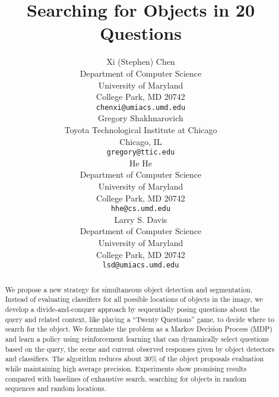\documentclass{article} %
\title{Searching for Objects in 20 Questions}
\author{
Xi (Stephen) Chen\\
Department of Computer Science\\
University of Maryland\\
College Park, MD 20742 \\
\texttt{chenxi@umiacs.umd.edu} \\
\And
Gregory Shakhnarovich\\
Toyota Technological Institute at Chicago \\
Chicago, IL\\
\texttt{gregory@ttic.edu} \\
\AND
He He \\
Department of Computer Science\\
University of Maryland\\
College Park, MD 20742 \\
\texttt{hhe@cs.umd.edu} \\
\And
Larry S. Davis \\
Department of Computer Science\\
University of Maryland\\
College Park, MD 20742 \\
\texttt{lsd@umiacs.umd.edu} 
}
\begin{document}
\maketitle

\begin{abstract}
We propose a new strategy for simultaneous object detection and segmentation. Instead of evaluating classifiers for all possible locations of objects in the
image, we develop a divide-and-conquer approach by sequentially posing questions about the query and related context, like playing a ``Twenty Questions'' game, to decide where to search for the object. We formulate the problem as a Markov Decision Process (MDP) and learn a policy using reinforcement learning that can dynamically select questions based on the query, the scene and current observed responses given by object detectors and classifiers. The algorithm reduces about 30\% of the object proposals evaluation while maintaining high average precision. Experiments show promising results compared with baselines of exhaustive search, searching for objects in random sequences and random locations.
\end{abstract}



% 

% 
% 






{\small


}
\end{document}
